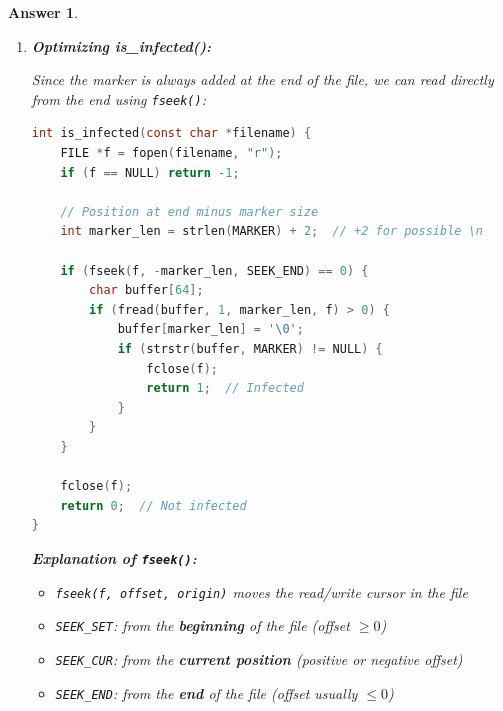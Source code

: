 \documentclass[a4paper,11pt]{article}
\theoremstyle{plain}
\newtheorem{correction}{Answer}
\theoremstyle{definition}
\begin{document}
\begin{correction}
\begin{enumerate}
\textbf{``w'' (write) mode:}
\begin{itemize}
\item Erases all existing content
\item The file is \textbf{emptied} then rewritten from the beginning
\item The original content is \textbf{destroyed}
\item The infected program no longer works at all
\end{itemize}

A virus must preserve infected file functionality to:
\begin{itemize}
\item Remain stealthy (the user notices nothing)
\item Enable propagation (the program must execute)
\end{itemize}

\item \textbf{Optimizing is\_infected():}

Since the marker is always added at the end of the file, we can read directly from the end using \texttt{fseek()}:

\begin{lstlisting}[language=C]
int is_infected(const char *filename) {
    FILE *f = fopen(filename, "r");
    if (f == NULL) return -1;

    // Position at end minus marker size
    int marker_len = strlen(MARKER) + 2;  // +2 for possible \n

    if (fseek(f, -marker_len, SEEK_END) == 0) {
        char buffer[64];
        if (fread(buffer, 1, marker_len, f) > 0) {
            buffer[marker_len] = '\0';
            if (strstr(buffer, MARKER) != NULL) {
                fclose(f);
                return 1;  // Infected
            }
        }
    }

    fclose(f);
    return 0;  // Not infected
}
\end{lstlisting}

\textbf{Explanation of \texttt{fseek()}:}
\begin{itemize}
\item \texttt{fseek(f, offset, origin)} moves the read/write cursor in the file
\item \texttt{SEEK\_SET}: from the \textbf{beginning} of the file (offset $\geq 0$)
\item \texttt{SEEK\_CUR}: from the \textbf{current position} (positive or negative offset)
\item \texttt{SEEK\_END}: from the \textbf{end} of the file (offset usually $\leq 0$)
\end{itemize}


\end{enumerate}
\end{correction}
\end{document}
